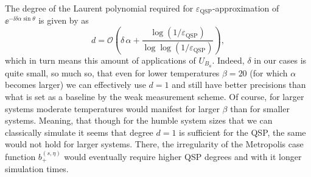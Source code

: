 The degree of the Laurent polynomial required for $\varepsilon_\text{QSP}$-approximation of $\ee^{-\ii\delta\alpha\sin\theta}$ is given by \cite[Theorem 7.]{motlagh2024generalized} as
$$
d = \mathcal{O}\!\left(\delta\,\alpha + \frac{\log(1/\varepsilon_\mathrm{QSP})}{\log\log(1/\varepsilon_\mathrm{QSP})}\right),
$$
which in turn means this amount of applications of $U_{B_a}$. Indeed, $\delta$ in our cases is quite small, so much so, that even for lower temperatures $\beta = 20$ (for which $\alpha$ becomes larger) we can effectively use $d = 1$ and still have better precisions than what is set as a baseline by the weak measurement scheme. Of course, for larger systems moderate temperatures would manifest for larger $\beta$ than for smaller systems. Meaning, that though for the humble system sizes that we can classically simulate it seems that degree $d = 1$ is sufficient for the QSP, the same would not hold for larger systems. There, the irregularity of the Metropolis case function $b_+^{(s, \eta)}$ would eventually require higher QSP degrees and with it longer simulation times.

